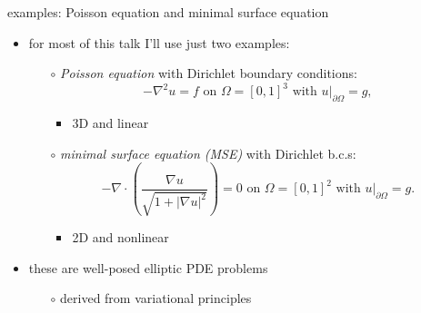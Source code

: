 \documentclass[hide notes,intlimits,usenames,dvipsnames]{beamer}
\newcommand{\grad}{\nabla}
\begin{document}
\begin{frame}{examples: Poisson equation and minimal surface equation}

\begin{itemize}
\item for most of this talk I'll use just two examples:
	\begin{itemize}

    \bigskip
	\item[$\circ$] \emph{Poisson equation} with Dirichlet boundary conditions:
	    $$- \grad^2 u = f \text{ on } \Omega = [0,1]^3 \text{ with } u\big|_{\partial \Omega} = g,$$
	    \vspace{-5mm}
		\begin{itemize}
		\item 3D and linear
		\end{itemize}

    \bigskip
	\item[$\circ$] \emph{minimal surface equation (MSE)} with Dirichlet b.c.s:
	    $$- \grad\cdot \left(\frac{\grad u}{\sqrt{1 + |\grad u|^2}}\right) = 0  \text{ on } \Omega = [0,1]^2 \text{ with } u\big|_{\partial \Omega} = g.$$
	    \vspace{-2mm}
		\begin{itemize}
		\item 2D and nonlinear
		\end{itemize}
	\end{itemize}

\medskip
\item these are well-posed elliptic PDE problems
	\begin{itemize}
	\item[$\circ$] derived from variational principles
	\end{itemize}
\end{itemize}
\end{frame}
\end{document}
